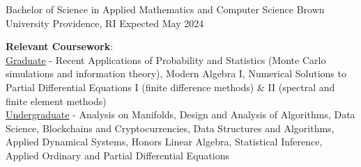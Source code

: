 
\begin{cventries}
  \cventry
    {Bachelor of Science in Applied Mathematics and Computer Science} %
    {Brown University} %
    {Providence, RI} %
    {Expected May 2024} %
    {
      \begin{cvitems} %
         \item {\textbf{Relevant Coursework}: \\
         \underline{Graduate} -  Recent Applications of Probability and Statistics (Monte Carlo simulations and information theory), Modern Algebra I, Numerical Solutions to Partial Differential Equations I (finite difference methods) \& II (spectral and finite element methods) \\ 
         \underline{Undergraduate} - Analysis on Manifolds, Design and Analysis of Algorithms, Data Science, Blockchains and Cryptocurrencies, Data Structures and Algorithms, Applied Dynamical Systems, Honors Linear Algebra, Statistical Inference, Applied Ordinary and Partial Differential Equations}
      \end{cvitems}
    }
\end{cventries}
